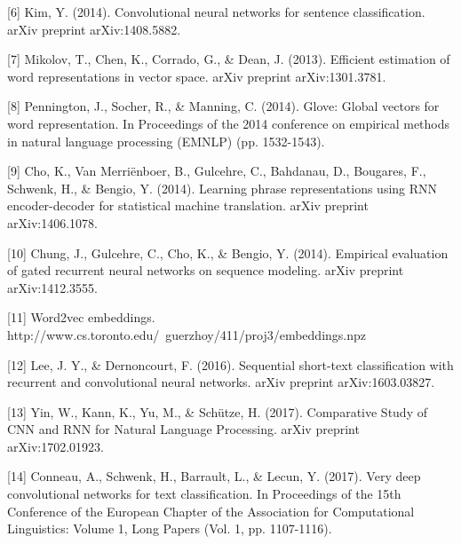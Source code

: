 \documentclass{article}
\begin{document}
[6] Kim, Y. (2014). Convolutional neural networks for sentence classification. arXiv preprint arXiv:1408.5882.

[7] Mikolov, T., Chen, K., Corrado, G., \& Dean, J. (2013). Efficient estimation of word representations in vector space. arXiv preprint arXiv:1301.3781.

[8] Pennington, J., Socher, R., \& Manning, C. (2014). Glove: Global vectors for word representation. In Proceedings of the 2014 conference on empirical methods in natural language processing (EMNLP) (pp. 1532-1543).

[9] Cho, K., Van Merriënboer, B., Gulcehre, C., Bahdanau, D., Bougares, F., Schwenk, H., \& Bengio, Y. (2014). Learning phrase representations using RNN encoder-decoder for statistical machine translation. arXiv preprint arXiv:1406.1078.

[10] Chung, J., Gulcehre, C., Cho, K., \& Bengio, Y. (2014). Empirical evaluation of gated recurrent neural networks on sequence modeling. arXiv preprint arXiv:1412.3555.

[11] Word2vec embeddings. http://www.cs.toronto.edu/~guerzhoy/411/proj3/embeddings.npz

[12] Lee, J. Y., \& Dernoncourt, F. (2016). Sequential short-text classification with recurrent and convolutional neural networks. arXiv preprint arXiv:1603.03827.

[13] Yin, W., Kann, K., Yu, M., \& Schütze, H. (2017). Comparative Study of CNN and RNN for Natural Language Processing. arXiv preprint arXiv:1702.01923.

[14] Conneau, A., Schwenk, H., Barrault, L., \& Lecun, Y. (2017). Very deep convolutional networks for text classification. In Proceedings of the 15th Conference of the European Chapter of the Association for Computational Linguistics: Volume 1, Long Papers (Vol. 1, pp. 1107-1116).
\end{document}
